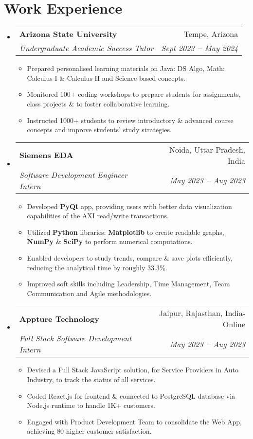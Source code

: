 \documentclass[letterpaper,11pt]{article}
\makeatletter
\newcommand{\resumeItem}[1]{
  \item\small{
    {#1 \vspace{-2pt}}
  }
}
\newcommand{\resumeSubheading}[4]{
  \vspace{-2pt}\item
    \begin{tabular*}{0.97\textwidth}[t]{l@{\extracolsep{\fill}}r}
      \textbf{#1} & #2 \\
      \textit{\small#3} & \textit{\small #4} \\
    \end{tabular*}\vspace{-7pt}
}
\newcommand{\resumeSubHeadingListStart}{\begin{itemize}[leftmargin=0.15in, label={}]}
\newcommand{\resumeSubHeadingListEnd}{\end{itemize}}
\newcommand{\resumeItemListStart}{\begin{itemize}[leftmargin=0.2in]}
\newcommand{\resumeItemListEnd}{\end{itemize}\vspace{-5pt}}
\makeatother
\begin{document}

\section{Work Experience}
  \resumeSubHeadingListStart

    \resumeSubheading
      {Arizona State University}{Tempe, Arizona}
      {Undergraduate Academic Success Tutor}{Sept 2023 \textbf{--} May 2024}
        \resumeItemListStart
          \resumeItem{Prepared personalised learning materials on Java: DS Algo, Math: Calculus-I \& Calculus-II and Science based concepts.}
          \resumeItem{Monitored 100+ coding workshops to prepare students for assignments, class projects \& to foster collaborative learning.}
          \resumeItem{Instructed 1000+ students to review introductory \& advanced course concepts and improve students' study strategies.}
        \resumeItemListEnd

    \resumeSubheading
      {Siemens EDA}{Noida, Uttar Pradesh, India}
      {Software Development Engineer Intern}{May 2023 \textbf{--} Aug 2023}
        \resumeItemListStart
          \resumeItem{Developed \textbf{PyQt} app, providing users with better data visualization capabilities of the AXI read/write transactions.}
          \resumeItem{Utilized \textbf{Python} libraries: \textbf{Matplotlib} to create readable graphs, \textbf{NumPy} \& \textbf{SciPy} to perform numerical computations.}
          \resumeItem{Enabled developers to study trends, compare \& save plots efficiently, reducing the analytical time by roughly 33.3\%.}
          \resumeItem{Improved soft skills including Leadership, Time Management, Team Communication and Agile methodologies.}
        \resumeItemListEnd

    \resumeSubheading
      {Appture Technology}{Jaipur, Rajasthan, India- Online}
      {Full Stack Software Development Intern}{May 2023 \textbf{--} Aug 2023}
        \resumeItemListStart
            \resumeItem{Devised a Full Stack JavaScript solution, for Service Providers in Auto Industry, to track the status of all services.}
            \resumeItem{Coded React.js for frontend \& connected to PostgreSQL database via Node.js runtime to handle 1K+ customers.}
            \resumeItem{Engaged with Product Development Team to consolidate the Web App, achieving 80 higher customer satisfaction.}
        \resumeItemListEnd
  \resumeSubHeadingListEnd
\end{document}

